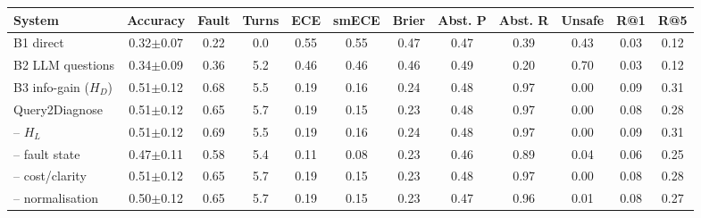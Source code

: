 \begin{tabular}{lccccccccccc}
\toprule
System & Accuracy & Fault & Turns & ECE & smECE & Brier & Abst. P & Abst. R & Unsafe & R@1 & R@5 \\
\midrule
B1 direct & 0.32$\pm$0.07 & 0.22 & 0.0 & 0.55 & 0.55 & 0.47 & 0.47 & 0.39 & 0.43 & 0.03 & 0.12 \\
B2 LLM questions & 0.34$\pm$0.09 & 0.36 & 5.2 & 0.46 & 0.46 & 0.46 & 0.49 & 0.20 & 0.70 & 0.03 & 0.12 \\
B3 info-gain ($H_D$) & 0.51$\pm$0.12 & 0.68 & 5.5 & 0.19 & 0.16 & 0.24 & 0.48 & 0.97 & 0.00 & 0.09 & 0.31 \\
Query2Diagnose & 0.51$\pm$0.12 & 0.65 & 5.7 & 0.19 & 0.15 & 0.23 & 0.48 & 0.97 & 0.00 & 0.08 & 0.28 \\
-- $H_L$ & 0.51$\pm$0.12 & 0.69 & 5.5 & 0.19 & 0.16 & 0.24 & 0.48 & 0.97 & 0.00 & 0.09 & 0.31 \\
-- fault state & 0.47$\pm$0.11 & 0.58 & 5.4 & 0.11 & 0.08 & 0.23 & 0.46 & 0.89 & 0.04 & 0.06 & 0.25 \\
-- cost/clarity & 0.51$\pm$0.12 & 0.65 & 5.7 & 0.19 & 0.15 & 0.23 & 0.48 & 0.97 & 0.00 & 0.08 & 0.28 \\
-- normalisation & 0.50$\pm$0.12 & 0.65 & 5.7 & 0.19 & 0.15 & 0.23 & 0.47 & 0.96 & 0.01 & 0.08 & 0.27 \\
\bottomrule
\end{tabular}
